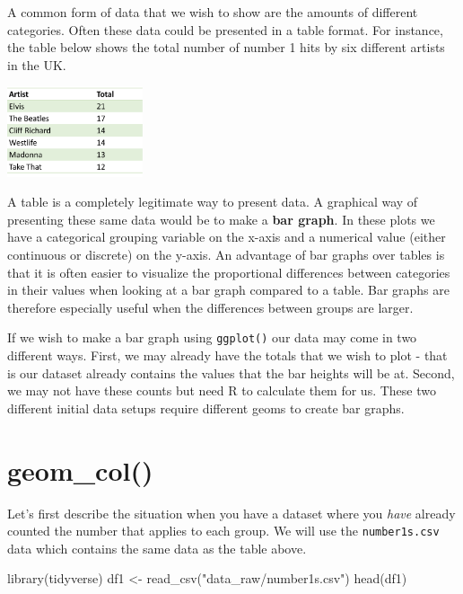 \documentclass[
  letterpaper,
  DIV=11,
  numbers=noendperiod]{scrreprt}
\newenvironment{Shaded}{\begin{snugshade}}{\end{snugshade}}
\newcommand{\FunctionTok}[1]{\textcolor[rgb]{0.28,0.35,0.67}{#1}}
\newcommand{\NormalTok}[1]{\textcolor[rgb]{0.00,0.23,0.31}{#1}}
\newcommand{\OtherTok}[1]{\textcolor[rgb]{0.00,0.23,0.31}{#1}}
\newcommand{\StringTok}[1]{\textcolor[rgb]{0.13,0.47,0.30}{#1}}
\begin{document}
A common form of data that we wish to show are the amounts of different
categories. Often these data could be presented in a table format. For
instance, the table below shows the total number of number 1 hits by six
different artists in the UK.

\includegraphics[width=0.3\textwidth,height=\textheight]{./img/tab1.png}

A table is a completely legitimate way to present data. A graphical way
of presenting these same data would be to make a \textbf{bar graph}. In
these plots we have a categorical grouping variable on the x-axis and a
numerical value (either continuous or discrete) on the y-axis. An
advantage of bar graphs over tables is that it is often easier to
visualize the proportional differences between categories in their
values when looking at a bar graph compared to a table. Bar graphs are
therefore especially useful when the differences between groups are
larger.

If we wish to make a bar graph using \texttt{ggplot()} our data may come
in two different ways. First, we may already have the totals that we
wish to plot - that is our dataset already contains the values that the
bar heights will be at. Second, we may not have these counts but need R
to calculate them for us. These two different initial data setups
require different geoms to create bar graphs.

\hypertarget{geom_col}{%
\section{\texorpdfstring{\textbf{geom\_col()}}{geom\_col()}}\label{geom_col}}

Let's first describe the situation when you have a dataset where you
\emph{have} already counted the number that applies to each group. We
will use the \texttt{number1s.csv} data which contains the same data as
the table above.

\begin{Shaded}
\begin{Highlighting}[]
\FunctionTok{library}\NormalTok{(tidyverse)}
\NormalTok{df1 }\OtherTok{\textless{}{-}} \FunctionTok{read\_csv}\NormalTok{(}\StringTok{"data\_raw/number1s.csv"}\NormalTok{)}
\FunctionTok{head}\NormalTok{(df1)}
\end{Highlighting}
\end{Shaded}
\end{document}

